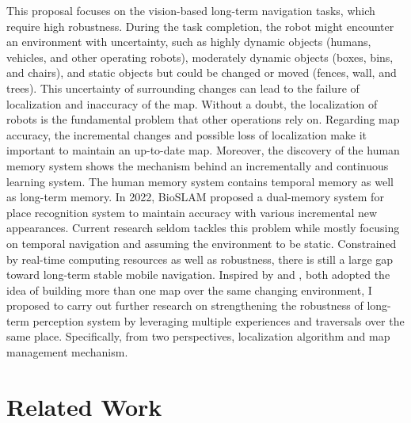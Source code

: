 This proposal focuses on the vision-based long-term navigation tasks, which require 
high robustness. During the task completion, the robot might encounter an environment with uncertainty, such as highly dynamic objects (humans, vehicles, and other operating robots), moderately dynamic objects (boxes, bins, and chairs), and static objects but could be changed or moved (fences, wall, and trees). This uncertainty of surrounding changes 
can lead to the failure of localization and inaccuracy of the map. Without a doubt, the localization of robots is the fundamental problem that other operations rely on.
Regarding map accuracy, the incremental changes and possible loss of localization make it important to maintain an up-to-date map. Moreover, the discovery of the human memory system shows the mechanism behind an incrementally and continuous learning system. The human memory system contains temporal memory as well as long-term memory. In 2022, BioSLAM\cite{yin2022bioslam} proposed a dual-memory system for place recognition system to maintain accuracy with various incremental new appearances. Current research seldom tackles this problem while mostly focusing on temporal navigation and assuming the environment to be static. Constrained by real-time computing resources as well as robustness, there is still a large gap toward long-term stable mobile navigation. Inspired by \cite{yin2022bioslam} and \cite{paton2016bridging}, both adopted the idea of building more than one map over the same changing environment, I proposed to carry out further research on strengthening the robustness of long-term perception system by leveraging multiple experiences and traversals over the same place. Specifically, from two perspectives, localization algorithm and map management mechanism.


\section{Related Work}
